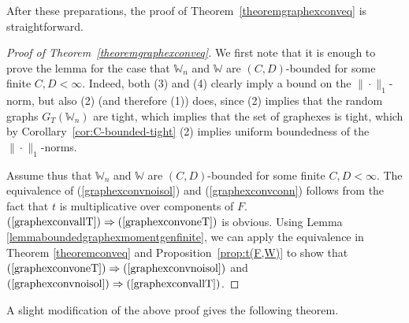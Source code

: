 \documentclass{amsart}
\numberwithin{equation}{section}
\numberwithin{figure}{section}
\theoremstyle{definition}
\theoremstyle{remark}
\newcommand{\cW}{\mathbb{W}}
\begin{document}
After these preparations, the proof of Theorem~\ref{theoremgraphexconveq} is
straightforward.

\begin{proof}[Proof of Theorem~\ref{theoremgraphexconveq}]
We first note that it is enough to prove the lemma for the case that $\cW_n$
and $\cW$ are $(C,D)$-bounded for some finite $C,D<\infty$. Indeed, both (3)
and (4) clearly imply a bound on the $\|\cdot\|_1$-norm, but also (2) (and
therefore (1)) does, since (2) implies that the random graphs $G_T(\cW_n)$
are tight, which implies that the set of graphexes is tight, which by
Corollary~\ref{cor:C-bounded-tight} (2) implies uniform boundedness of the
$\|\cdot\|_1$-norms.

Assume thus that $\cW_n$ and $\cW$ are $(C,D)$-bounded for some finite
$C,D<\infty$. The equivalence of (\ref{graphexconvnoisol}) and
(\ref{graphexconvconn}) follows from the fact that $t$ is multiplicative over
components of $F$. $(\ref{graphexconvallT}) \Rightarrow
(\ref{graphexconvoneT})$ is obvious. Using Lemma
\ref{lemmaboundedgraphexmomentgenfinite}, we can apply the equivalence in
Theorem \ref{theoremconveq} and Proposition~\ref{prop:t(F,W)} to show that
$(\ref{graphexconvoneT}) \Rightarrow (\ref{graphexconvnoisol})$ and
$(\ref{graphexconvnoisol}) \Rightarrow (\ref{graphexconvallT})$.
\end{proof}

A slight modification of the above proof gives the following theorem.
\end{document}
